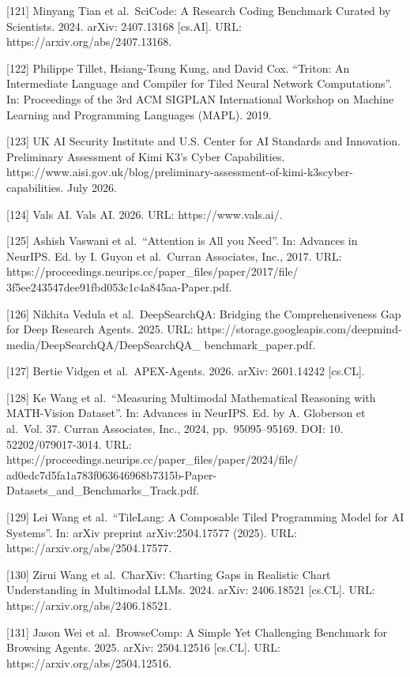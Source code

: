 \documentclass[
  10
]{article}
\begin{document}
{[}121{]} Minyang Tian et al.~SciCode: A Research Coding Benchmark
Curated by Scientists. 2024. arXiv: 2407.13168 {[}cs.AI{]}. URL:
https://arxiv.org/abs/2407.13168.

{[}122{]} Philippe Tillet, Hsiang-Tsung Kung, and David Cox. ``Triton:
An Intermediate Language and Compiler for Tiled Neural Network
Computations''. In: Proceedings of the 3rd ACM SIGPLAN International
Workshop on Machine Learning and Programming Languages (MAPL). 2019.

{[}123{]} UK AI Security Institute and U.S. Center for AI Standards and
Innovation. Preliminary Assessment of Kimi K3's Cyber Capabilities.
https://www.aisi.gov.uk/blog/preliminary-assessment-of-kimi-k3scyber-capabilities.
July 2026.

{[}124{]} Vals AI. Vals AI. 2026. URL: https://www.vals.ai/.

{[}125{]} Ashish Vaswani et al.~``Attention is All you Need''. In:
Advances in NeurIPS. Ed. by I. Guyon et al.~Curran Associates, Inc.,
2017. URL: https://proceedings.neurips.cc/paper\_files/paper/2017/file/
3f5ee243547dee91fbd053c1c4a845aa-Paper.pdf.

{[}126{]} Nikhita Vedula et al.~DeepSearchQA: Bridging the
Comprehensiveness Gap for Deep Research Agents. 2025. URL:
https://storage.googleapis.com/deepmind-
media/DeepSearchQA/DeepSearchQA\_ benchmark\_paper.pdf.

{[}127{]} Bertie Vidgen et al.~APEX-Agents. 2026. arXiv: 2601.14242
{[}cs.CL{]}.

{[}128{]} Ke Wang et al.~``Measuring Multimodal Mathematical Reasoning
with MATH-Vision Dataset''. In: Advances in NeurIPS. Ed. by A. Globerson
et al.~Vol. 37. Curran Associates, Inc., 2024, pp.~95095--95169. DOI:
10. 52202/079017-3014. URL:
https://proceedings.neurips.cc/paper\_files/paper/2024/file/
ad0edc7d5fa1a783f063646968b7315b-Paper-Datasets\_and\_Benchmarks\_Track.pdf.

{[}129{]} Lei Wang et al.~``TileLang: A Composable Tiled Programming
Model for AI Systems''. In: arXiv preprint arXiv:2504.17577 (2025). URL:
https://arxiv.org/abs/2504.17577.

{[}130{]} Zirui Wang et al.~CharXiv: Charting Gaps in Realistic Chart
Understanding in Multimodal LLMs. 2024. arXiv: 2406.18521 {[}cs.CL{]}.
URL: https://arxiv.org/abs/2406.18521.

{[}131{]} Jason Wei et al.~BrowseComp: A Simple Yet Challenging
Benchmark for Browsing Agents. 2025. arXiv: 2504.12516 {[}cs.CL{]}. URL:
https://arxiv.org/abs/2504.12516.
\end{document}
